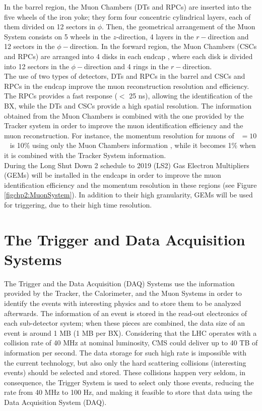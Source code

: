 \noindent In the barrel region, the Muon Chambers (DTs and RPCs) are inserted into the 
five wheels of the iron yoke; they form four concentric cylindrical 
layers, each of them divided on 12 sectors in $\phi$. Then, the geometrical 
arrangement of the Muon System consists on 5 wheels in the $z$-direction, 4 layers in 
the $r-$direction and 12 sectors in the $\phi-$direction. In the forward region, the Muon 
Chambers (CSCs and RPCs) are arranged into 4 disks in each endcap , where each disk is 
divided into 12 sectors in the $\phi-$direction and 4 rings in the $r-$direction. \\

\noindent The use of two types of detectors, DTs and RPCs in the barrel and CSCs and RPCs in the endcap
improve the muon reconstruction resolution and efficiency. The RPCs provides a fast 
response ($<$ 25 ns), allowing the identification of the BX, while the DTs and CSCs provide 
a high spatial resolution. The information obtained from the Muon Chambers
is combined with the one provided by the Tracker system in order to 
improve the muon identification efficiency and the muon reconstruction. For instance,
the momentum resolution for muons of \pt~$= 10$ \GeV~ is 10$\%$ using only the Muon Chambers information
, while it becomes 1$\%$ when it is combined with the Tracker System information\cite{chp2:CMSTDR}.\\

\noindent During the Long Shut Down 2 schedule to 2019 (LS2) Gas Electron Multipliers (GEMs) will be installed in 
the endcaps in order to improve the muon identification efficiency and the momentum resolution in 
these regions (see Figure \ref{figchp2:MuonSystem}). In addition to their 
high granularity, GEMs will be used for triggering, due to their high time resolution.

\section{The Trigger and Data Acquisition Systems}
\label{sec:Trigger}

\noindent The Trigger and the Data Acquisition (DAQ) Systems use the information 
provided by the Tracker, the Calorimeter, and the Muon Systems in order 
to identify the events with interesting physics and to store them to be 
analyzed afterwards. The information of an event is stored in 
the read-out electronics of each sub-detector system; when these 
pieces are combined, the data size of an event is around 
1 MB (1 MB per BX). Considering that the LHC 
operates with a collision rate of 40 MHz at nominal luminosity, CMS could 
deliver up to 40 TB of information per second. The data storage 
for such high rate is impossible with the current technology, but also only the hard
scattering collisions (interesting events) should be selected and stored. These collisions
happen very seldom, in consequence, the Trigger System is used to 
select only those events, reducing the rate from 40 MHz to 100 Hz, and making 
it feasible to store that data using the Data Acquisition System (DAQ).

